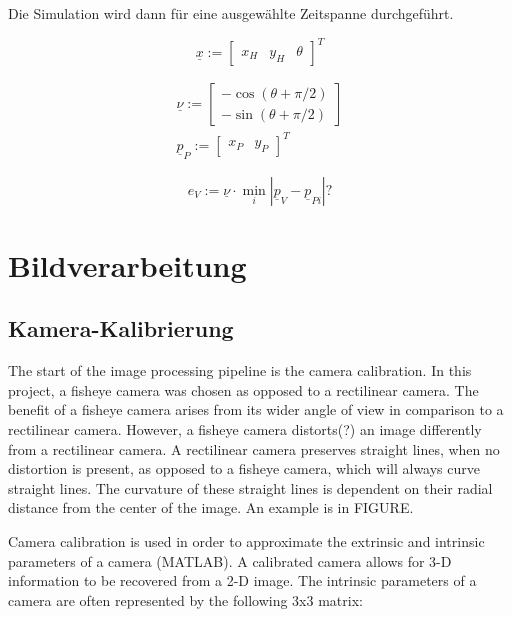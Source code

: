 \documentclass[arbeit=studie,oneside,BCOR=12mm]{ArbeitRST}
\begin{document}
Die Simulation wird dann für eine ausgewählte Zeitspanne durchgeführt.

    \begin{equation} 
        \underline{x} := 
        \begin{bmatrix}
            x_H & y_H & \theta
        \end{bmatrix}^T 
        \label{Zustandsvektor}
    \end{equation}




    \begin{gather}
        \underline{\nu} := 
        \begin{bmatrix}
            -\cos(\theta + \pi/2) \\
            -\sin(\theta + \pi/2)
        \end{bmatrix} \\
        \underline{p}_P := 
        \begin{bmatrix}
            x_P & y_P
        \end{bmatrix}^T
    \end{gather}

    \begin{equation}
        e_V :=  \underline{\nu} \cdot \min_i |\underline{p}_V -  \underline{p}_{Pi}| ?
        \label{eq:Querabweichung}
    \end{equation}

\chapter{Bildverarbeitung}
\section{Kamera-Kalibrierung}
The start of the image processing pipeline is the camera calibration. In this 
project, a fisheye camera was chosen as opposed to a rectilinear camera. The 
benefit of a 
fisheye camera arises from its wider angle of view in comparison to a 
rectilinear camera. However, a fisheye camera distorts(?) an image differently 
from a rectilinear 
camera. A rectilinear camera preserves straight lines, when no distortion is 
present, as opposed to a fisheye camera, which will always curve straight lines. 
The 
curvature of these straight lines is dependent on their radial distance from 
the center of the image.  An example is in FIGURE.

Camera calibration is used in order to approximate the extrinsic and intrinsic 
parameters of a camera (MATLAB). A calibrated camera allows for 3-D information
to be recovered from a 2-D image. The intrinsic parameters of a camera are often 
represented by the following 3x3 matrix:
\end{document}
